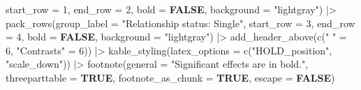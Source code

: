 \documentclass[
  bookmarksnumbered]{article}
\newenvironment{Shaded}{\begin{snugshade}}{\end{snugshade}}
\newcommand{\AttributeTok}[1]{\textcolor[rgb]{0.80,0.80,0.80}{#1}}
\newcommand{\ConstantTok}[1]{\textcolor[rgb]{0.86,0.64,0.64}{\textbf{#1}}}
\newcommand{\DecValTok}[1]{\textcolor[rgb]{0.86,0.86,0.80}{#1}}
\newcommand{\FunctionTok}[1]{\textcolor[rgb]{0.94,0.94,0.56}{#1}}
\newcommand{\NormalTok}[1]{\textcolor[rgb]{0.80,0.80,0.80}{#1}}
\newcommand{\OtherTok}[1]{\textcolor[rgb]{0.94,0.94,0.56}{#1}}
\newcommand{\SpecialCharTok}[1]{\textcolor[rgb]{0.86,0.64,0.64}{#1}}
\newcommand{\StringTok}[1]{\textcolor[rgb]{0.80,0.58,0.58}{#1}}
\begin{document}
\begin{Shaded}
\begin{Highlighting}[]
            \AttributeTok{start\_row =} \DecValTok{1}\NormalTok{,}
            \AttributeTok{end\_row =} \DecValTok{2}\NormalTok{,}
            \AttributeTok{bold =} \ConstantTok{FALSE}\NormalTok{,}
            \AttributeTok{background =} \StringTok{"lightgray"}\NormalTok{) }\SpecialCharTok{|\textgreater{}}
  \FunctionTok{pack\_rows}\NormalTok{(}\AttributeTok{group\_label =} \StringTok{"Relationship status: Single"}\NormalTok{,}
            \AttributeTok{start\_row =} \DecValTok{3}\NormalTok{,}
            \AttributeTok{end\_row =} \DecValTok{4}\NormalTok{,}
            \AttributeTok{bold =} \ConstantTok{FALSE}\NormalTok{,}
            \AttributeTok{background =} \StringTok{"lightgray"}\NormalTok{) }\SpecialCharTok{|\textgreater{}}
  \FunctionTok{add\_header\_above}\NormalTok{(}\FunctionTok{c}\NormalTok{(}\StringTok{" "} \OtherTok{=} \DecValTok{6}\NormalTok{, }\StringTok{"Contrasts"} \OtherTok{=} \DecValTok{6}\NormalTok{)) }\SpecialCharTok{|\textgreater{}} 
  \FunctionTok{kable\_styling}\NormalTok{(}\AttributeTok{latex\_options =} \FunctionTok{c}\NormalTok{(}\StringTok{"HOLD\_position"}\NormalTok{, }\StringTok{"scale\_down"}\NormalTok{)) }\SpecialCharTok{|\textgreater{}}
  \FunctionTok{footnote}\NormalTok{(}\AttributeTok{general =} \StringTok{"Significant effects are in bold."}\NormalTok{,}
           \AttributeTok{threeparttable =} \ConstantTok{TRUE}\NormalTok{,}
           \AttributeTok{footnote\_as\_chunk =} \ConstantTok{TRUE}\NormalTok{,}
           \AttributeTok{escape =} \ConstantTok{FALSE}\NormalTok{)}
\end{Highlighting}
\end{Shaded}
\end{document}
